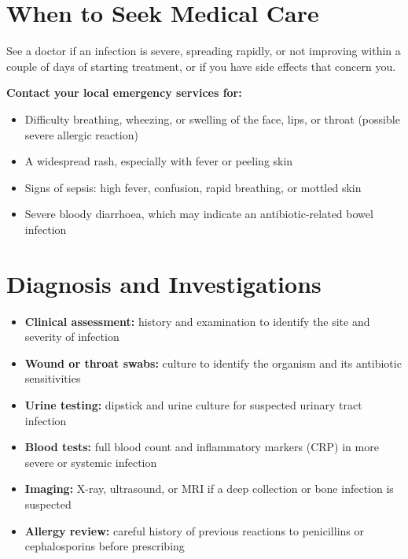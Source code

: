\section*{When to Seek Medical Care}
See a doctor if an infection is severe, spreading rapidly, or not improving within a couple of days of starting treatment, or if you have side effects that concern you.

\textbf{Contact your local emergency services for:}
\begin{itemize}
    \item Difficulty breathing, wheezing, or swelling of the face, lips, or throat (possible severe allergic reaction)
    \item A widespread rash, especially with fever or peeling skin
    \item Signs of sepsis: high fever, confusion, rapid breathing, or mottled skin
    \item Severe bloody diarrhoea, which may indicate an antibiotic-related bowel infection
\end{itemize}

\section*{Diagnosis and Investigations}
\begin{itemize}
    \item \textbf{Clinical assessment:} history and examination to identify the site and severity of infection
    \item \textbf{Wound or throat swabs:} culture to identify the organism and its antibiotic sensitivities
    \item \textbf{Urine testing:} dipstick and urine culture for suspected urinary tract infection
    \item \textbf{Blood tests:} full blood count and inflammatory markers (CRP) in more severe or systemic infection
    \item \textbf{Imaging:} X-ray, ultrasound, or MRI if a deep collection or bone infection is suspected
    \item \textbf{Allergy review:} careful history of previous reactions to penicillins or cephalosporins before prescribing
\end{itemize}

